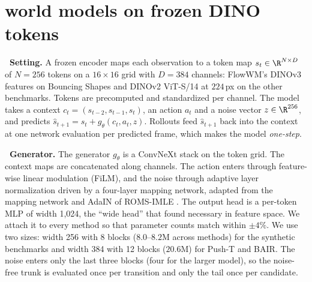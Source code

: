 \section{\Nom{} world models on frozen DINO tokens}
\label{sec:method}

\leavevmode{}\textbf{\thesubsection\ Setting.} A frozen encoder maps each observation to a token map $s_t \in \R^{N \times D}$ of $N = 256$ tokens on a $16\times16$ grid with $D = 384$ channels: FlowWM's DINOv3 features \citep{simeoni2025dinov3,porcher2026flowwm} on Bouncing Shapes and DINOv2 ViT-S/14 at $224$\,px \citep{oquab2024dinov2} on the other benchmarks. Tokens are precomputed and standardized per channel. The model takes a context $c_t = (s_{t-2}, s_{t-1}, s_t)$, an action $a_t$ and a noise vector $z \in \R^{256}$, and predicts $\hat{s}_{t+1} = s_t + g_\theta(c_t, a_t, z)$. Rollouts feed $\hat{s}_{t+1}$ back into the context at one network evaluation per predicted frame, which makes the model \emph{one-step}.

\leavevmode{}\textbf{\thesubsection\ Generator.} The generator $g_\theta$ is a ConvNeXt stack \citep{liu2022convnext} on the token grid. The context maps are concatenated along channels. The action enters through feature-wise linear modulation (FiLM), and the noise through adaptive layer normalization driven by a four-layer mapping network, adapted from the mapping network and AdaIN of ROMS-IMLE \citep{vashist2026roms}. The output head is a per-token MLP of width 1{,}024, the ``wide head'' that \citet{porcher2026flowwm} found necessary in feature space. We attach it to every method so that parameter counts match within $\pm4\%$. We use two sizes: width 256 with 8 blocks ($8.0$--$8.2$M across methods) for the synthetic benchmarks and width 384 with 12 blocks ($20.6$M) for Push-T and BAIR. The noise enters only the last three blocks (four for the larger model), so the noise-free trunk is evaluated once per transition and only the tail once per candidate.

